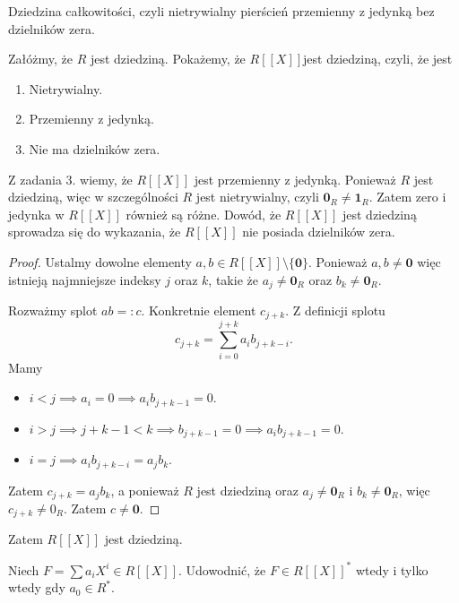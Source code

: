 \begin{solution}
	\begin{note}
		Dziedzina całkowitości, czyli nietrywialny pierścień przemienny z jedynką bez dzielników zera.
	\end{note}

	Załóżmy, że $R$ jest dziedziną. Pokażemy, że $R\left[ \left[ X \right]  \right] $jest dziedziną, czyli, że jest
	\begin{enumerate}[label=\arabic*)]
		\item Nietrywialny.
		\item Przemienny z jedynką.
		\item Nie ma dzielników zera.
	\end{enumerate}

Z zadania 3. wiemy, że $R\left[ \left[ X \right]  \right] $ jest przemienny z jedynką. Ponieważ $R$ jest dziedziną, więc w szczególności  $R$ jest nietrywialny, czyli $\mathbf{0}_{R}\neq \mathbf{1}_{R}$. Zatem zero i jedynka w $R\left[ \left[ X \right]  \right] $ również są różne. Dowód, że $R\left[ \left[ X \right]  \right]$ jest dziedziną sprowadza się do wykazania, że $R\left[ \left[ X \right]  \right] $ nie posiada dzielników zera.

\begin{proof}
Ustalmy dowolne elementy $a,b \in R\left[ \left[ X \right]  \right]\setminus \{\mathbf{0}\}  $. Ponieważ $a,b \neq \mathbf{0}$ więc istnieją najmniejsze indeksy $j$ oraz $k$, takie że $a_{j} \neq \mathbf{0}_{R}$ oraz $b_{k} \neq \mathbf{0}_{R}$.

Rozważmy splot $ab =: c$. Konkretnie element $c_{j+k}$. Z definicji splotu 
\[
c_{j+k} = \sum_{i=0}^{j+k} a_{i}b_{j+k - i}
.\] 
Mamy
\begin{itemize}
	\item $i<j \implies a_{i} = 0 \implies a_{i}b_{j+k-1} = 0$.
	\item $i > j \implies j + k - 1 < k \implies b_{j+k-1} = 0 \implies a_{i}b_{j+k-1} = 0$.
	\item $i = j \implies a_{i}b_{j+k-i} = a_{j}b_{k}$.	
\end{itemize}

Zatem $c_{j+k} = a_{j}b_{k}$, a ponieważ $R$ jest dziedziną oraz $a_{j} \neq \mathbf{0}_{R}$ i $b_{k} \neq \mathbf{0}_{R}$, więc $c_{j+k} \neq 0_{R}$. Zatem $c \neq \mathbf{0}$.
\end{proof} 
Zatem $R\left[ \left[ X \right]  \right] $ jest dziedziną.
\end{solution} 
\begin{problem}[5]

	Niech $F = \sum a_{i}X^{i} \in R\left[ \left[ X \right]  \right] $. Udowodnić, że $F \in R\left[ \left[ X \right]  \right] ^{\ast} $ wtedy i tylko wtedy gdy $a_0 \in R^{\ast} $.
\end{problem} 
